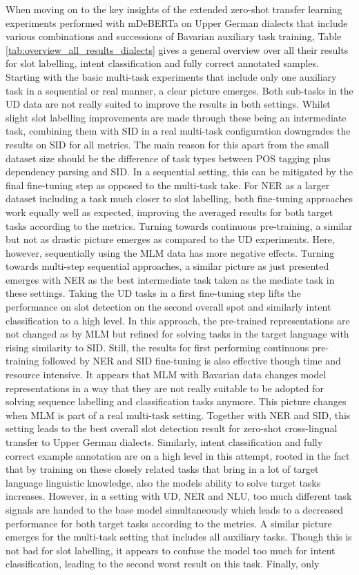 \documentclass[11pt,a4paper,twoside,openright]{scrbook}
\begin{document}
When moving on to the key insights of the extended zero-shot transfer learning experiments performed with mDeBERTa on Upper German dialects that include various combinations and successions of Bavarian auxiliary task training, Table \ref{tab:overview_all_results_dialects} gives a general overview over all their results for slot labelling, intent classification and fully correct annotated samples. Starting with the basic multi-task experiments that include only one auxiliary task in a sequential or real manner, a clear picture emerges. Both sub-tasks in the UD data are not really suited to improve the results in both settings. Whilst slight slot labelling improvements are made through these being an intermediate task, combining them with SID in a real multi-task configuration downgrades the results on SID for all metrics. The main reason for this apart from the small dataset size should be the difference of task types between POS tagging plus dependency parsing and SID. In a sequential setting, this can be mitigated by the final fine-tuning step as opposed to the multi-task take. For NER as a larger dataset including a task much closer to slot labelling, both fine-tuning approaches work equally well as expected, improving the averaged results for both target tasks according to the metrics. Turning towards continuous pre-training, a similar but not as drastic picture emerges as compared to the UD experiments. Here, however, sequentially using the MLM data has more negative effects. Turning towards multi-step sequential approaches, a similar picture as just presented emerges with NER as the best intermediate task taken as the mediate task in these settings. Taking the UD tasks in a first fine-tuning step lifts the performance on slot detection on the second overall spot and similarly intent classification to a high level. In this approach, the pre-trained representations are not changed as by MLM but refined for solving tasks in the target language with rising similarity to SID. Still, the results for first performing continuous pre-training followed by NER and SID fine-tuning is also effective though time and resource intensive. It appears that MLM with Bavarian data changes model representations in a way that they are not really suitable to be adopted for solving sequence labelling and classification tasks anymore. This picture changes when MLM is part of a real multi-task setting. Together with NER and SID, this setting leads to the best overall slot detection result for zero-shot cross-lingual transfer to Upper German dialects. Similarly, intent classification and fully correct example annotation are on a high level in this attempt, rooted in the fact that by training on these closely related tasks that bring in a lot of target language linguistic knowledge, also the models ability to solve target tasks increases. However, in a setting with UD, NER and NLU, too much different task signals are handed to the base model simultaneously which leads to a decreased performance for both target tasks according to the metrics. A similar picture emerges for the multi-task setting that includes all auxiliary tasks. Though this is not bad for slot labelling, it appears to confuse the model too much for intent classification, leading to the second worst result on this task. Finally, only 
\end{document}

